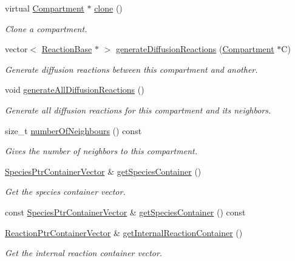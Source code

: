 \begin{DoxyCompactItemize}
virtual \hyperlink{classCompartment}{Compartment} $\ast$ \hyperlink{classCompartment_ad6aff171dd3aabf3a4d1a09597dc8ed8}{clone} ()
\begin{DoxyCompactList}\small\item\em Clone a compartment. \end{DoxyCompactList}\item 
vector$<$ \hyperlink{classReactionBase}{Reaction\+Base} $\ast$ $>$ \hyperlink{classCompartment_acd3bb41d1aa7d50702b56e49ac6b8ab0}{generate\+Diffusion\+Reactions} (\hyperlink{classCompartment}{Compartment} $\ast$C)
\begin{DoxyCompactList}\small\item\em Generate diffusion reactions between this compartment and another. \end{DoxyCompactList}\item 
void \hyperlink{classCompartment_ad5513d9ac3386773e4cdf4df7656b1b4}{generate\+All\+Diffusion\+Reactions} ()
\begin{DoxyCompactList}\small\item\em Generate all diffusion reactions for this compartment and its neighbors. \end{DoxyCompactList}\item 
size\+\_\+t \hyperlink{classCompartment_a7ba3cb0a0dde7a469c179869e552a2ca}{number\+Of\+Neighbours} () const 
\begin{DoxyCompactList}\small\item\em Gives the number of neighbors to this compartment. \end{DoxyCompactList}\item 
\hyperlink{classSpeciesPtrContainerVector}{Species\+Ptr\+Container\+Vector} \& \hyperlink{classCompartment_af0407bce7d4c28f95d4325b61849f97b}{get\+Species\+Container} ()
\begin{DoxyCompactList}\small\item\em Get the species container vector. \end{DoxyCompactList}\item 
const \hyperlink{classSpeciesPtrContainerVector}{Species\+Ptr\+Container\+Vector} \& \hyperlink{classCompartment_ae071029f358d287fc809fda71579ecec}{get\+Species\+Container} () const 
\item 
\hyperlink{classReactionPtrContainerVector}{Reaction\+Ptr\+Container\+Vector} \& \hyperlink{classCompartment_a70efce98051a16c78a9198664d58c5af}{get\+Internal\+Reaction\+Container} ()
\begin{DoxyCompactList}\small\item\em Get the internal reaction container vector. \end{DoxyCompactList}\item 

\end{DoxyCompactItemize}
